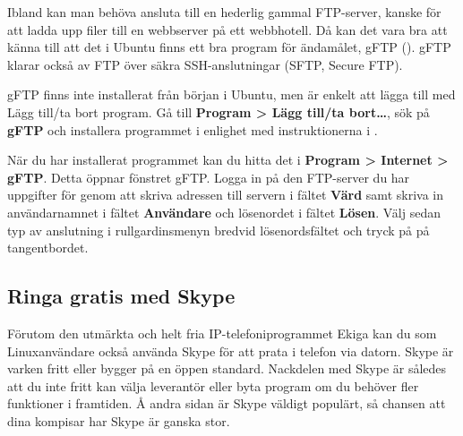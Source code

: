\documentclass[a4paper,final]{memoir} %
\begin{document}

Ibland kan man behöva ansluta till en hederlig gammal FTP-server, kanske för att ladda upp filer till en webbserver på ett webbhotell.  Då kan det vara bra att känna till att det i Ubuntu finns ett bra program för ändamålet, gFTP (). gFTP klarar också av FTP över säkra SSH-anslutningar (SFTP, Secure FTP).


gFTP finns inte installerat från början i Ubuntu, men är enkelt att lägga till med Lägg till/ta bort program. Gå till \textbf{Program \textgreater{} Lägg till/ta bort\ldots{}}, sök på \textbf{gFTP} och installera programmet i enlighet med instruktionerna i .

När du har installerat programmet kan du hitta det i \textbf{Program \textgreater{} Internet \textgreater{} gFTP}. Detta öppnar fönstret gFTP. Logga in på den FTP-server du har uppgifter för genom att skriva adressen till servern i fältet \textbf{Värd} samt skriva in användarnamnet i fältet \textbf{Användare} och lösenordet i fältet \textbf{Lösen}. Välj sedan typ av anslutning i rullgardinsmenyn bredvid lösenordsfältet och tryck på \xenter{} på tangentbordet.


\subsection{Ringa gratis med Skype}\label{skype}


Förutom den utmärkta och helt fria IP-telefoniprogrammet Ekiga kan du som Linuxanvändare också använda Skype för att prata i telefon via datorn. Skype är varken fritt eller bygger på en öppen standard. Nackdelen med Skype är således att du inte fritt kan välja leverantör eller byta program om du behöver fler funktioner i framtiden. Å andra sidan är Skype väldigt populärt, så chansen att dina kompisar har Skype är ganska stor.

\end{document}
